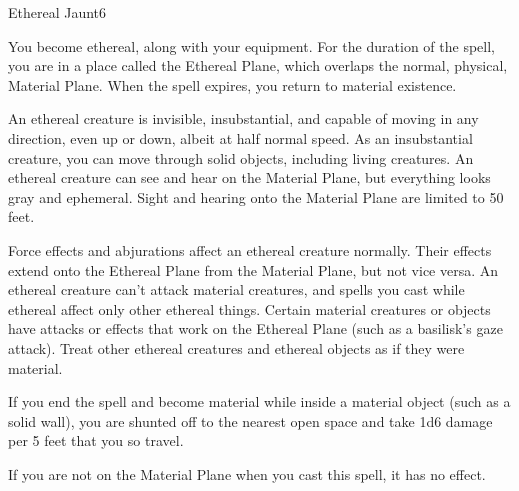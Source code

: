 \begin{spellsection}{Ethereal Jaunt}{6}
    \begin{spellheader}
    \end{spellheader}
    \begin{spellcontent}
        \begin{spelltargetinginfo}
        \end{spelltargetinginfo}
        \begin{spelleffects}
            \spelleffect You become ethereal, along with your equipment. For the duration of the spell, you are in a place called the Ethereal Plane, which overlaps the normal, physical, Material Plane. When the spell expires, you return to material existence.
            \par An ethereal creature is invisible, insubstantial, and capable of moving in any direction, even up or down, albeit at half normal speed. As an insubstantial creature, you can move through solid objects, including living creatures. An ethereal creature can see and hear on the Material Plane, but everything looks gray and ephemeral. Sight and hearing onto the Material Plane are limited to 50 feet.
            \par Force effects and abjurations affect an ethereal creature normally. Their effects extend onto the Ethereal Plane from the Material Plane, but not vice versa. An ethereal creature can't attack material creatures, and spells you cast while ethereal affect only other ethereal things. Certain material creatures or objects have attacks or effects that work on the Ethereal Plane (such as a basilisk's gaze attack). Treat other ethereal creatures and ethereal objects as if they were material. 
            \par If you end the spell and become material while inside a material object (such as a solid wall), you are shunted off to the nearest open space and take 1d6 damage per 5 feet that you so travel.
            \spelldur \durshort \dismissable
        \end{spelleffects}
    \end{spellcontent}
    \begin{spellfooter}
        \spellnotes If you are not on the Material Plane when you cast this spell, it has no effect.
        \miscastexplode
    \end{spellfooter}
\end{spellsection}

